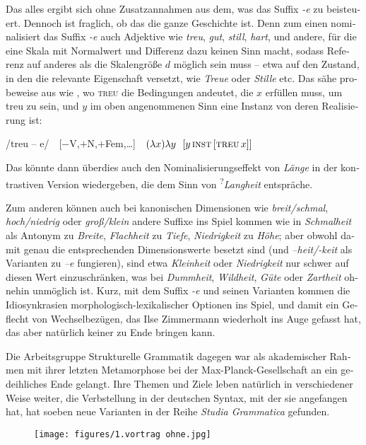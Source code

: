 \documentclass[output=paper,colorlinks,citecolor=brown]{langscibook}
\begin{document}
\begin{otherlanguage}{german}
Das alles ergibt sich ohne Zusatzannahmen aus dem, was das Suffix \textit{-e} zu  beisteuert. Dennoch ist fraglich, ob das die ganze Geschichte ist. Denn zum einen nominalisiert das Suffix \textit{-e} auch Adjektive wie \textit{treu}, \textit{gut}, \textit{still}, \textit{hart}, und andere, für die eine Skala mit Normalwert und Differenz dazu keinen Sinn macht, sodass Referenz auf anderes als die Skalengröße $d$ möglich sein muss -- etwa auf den Zustand, in den die relevante Eigenschaft versetzt, wie \textit{Treue} oder \textit{Stille} etc. Das sähe probeweise aus wie , wo \textsc{treu} die Bedingungen andeutet, die $x$ erfüllen muss, um treu zu sein, und $y$ im oben angenommenen Sinn eine Instanz von deren Realisierung ist:

\ea /treu -- e/ \,\, [$-$V,$+$N,$+$Fem,\dots] \,\, $(\lambda x) \lambda y \,\,\,\, [ y\, \textsc{inst}\, [\textsc{treu}\, x ]]$
\label{ex:23}
\z 

\noindent Das könnte dann überdies auch den Nominalisierungseffekt von \textit{Länge} in der kontrastiven Version wiedergeben, die dem Sinn von \textsuperscript{?}\textit{Langheit} entspräche.

Zum anderen können auch bei kanonischen Dimensionen wie \textit{breit/schmal}, \textit{hoch/niedrig} oder \textit{groß/klein} andere Suffixe ins Spiel kommen wie in \textit{Schmalheit} als Antonym zu \textit{Breite}, \textit{Flachheit} zu \textit{Tiefe}, \textit{Niedrigkeit} zu \textit{Höhe}; aber obwohl damit genau die entsprechenden Dimensionswerte besetzt sind (und \textit{–heit/-keit} als Varianten zu \textit{–e} fungieren), sind etwa \textit{Kleinheit} oder \textit{Niedrigkeit} nur schwer auf diesen Wert einzuschränken, was bei \textit{Dummheit}, \textit{Wildheit}, \textit{Güte} oder \textit{Zartheit} ohnehin unmöglich ist. Kurz, mit dem Suffix \textit{-e} und seinen Varianten kommen die Idiosynkrasien morphologisch-lexikalischer Optionen ins Spiel, und damit ein Geflecht von Wechselbezügen, das Ilse Zimmermann wiederholt ins Auge gefasst hat, das aber natürlich keiner zu Ende bringen kann.

Die Arbeitsgruppe Strukturelle Grammatik dagegen war als akademischer Rahmen mit ihrer letzten Metamorphose bei der Max-Planck-Gesellschaft an ein gedeihliches Ende gelangt. Ihre Themen und Ziele leben natürlich in verschiedener Weise weiter, die Verbstellung in der deutschen Syntax, mit der sie angefangen hat, hat soeben neue Varianten in der Reihe \textit{Studia Grammatica} gefunden.


\sloppy
\printbibliography[heading=subbibliography,notkeyword=this]

\begin{figure}
    \texttt{[image: figures/1.vortrag ohne.jpg]}%
\end{figure}


\end{otherlanguage}
\end{document}
